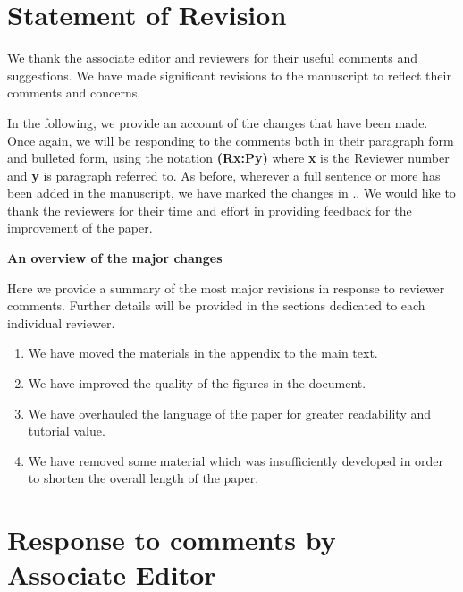 \documentclass{letter}
\newcommand{\rr}[1]{{\bf \color{blue}{#1}}}
\begin{document}
\section{Statement of Revision}

We thank the associate editor and reviewers for their useful comments and suggestions. We have made significant revisions to the manuscript to reflect their comments and concerns. 

In the following, we provide an account of the changes that have been made. Once again, we will be responding to the comments both in their paragraph form and bulleted form, using the notation {\bf {\color{red}(Rx:Py)}} where {\bf x} is the Reviewer number and {\bf y} is paragraph referred to. %
As before, wherever a full sentence or more has been added in the manuscript, we have marked the changes in \rr{blue}.. We would like to thank the reviewers for their time and effort in providing feedback for the improvement of the paper.

\noindent\textbf{An overview of the major changes}

Here we provide a summary of the most major revisions in response to reviewer comments. Further details will be provided in the sections dedicated to each individual reviewer.

\begin{enumerate}
\item We have moved the materials in the appendix to the main text.
\item We have improved the quality of the figures in the document.
\item We have overhauled the language of the paper for greater readability and tutorial value.
\item We have removed some material which was insufficiently developed in order to shorten the overall length of the paper.

\end{enumerate}

\section{Response to comments by Associate Editor}
\end{document}
